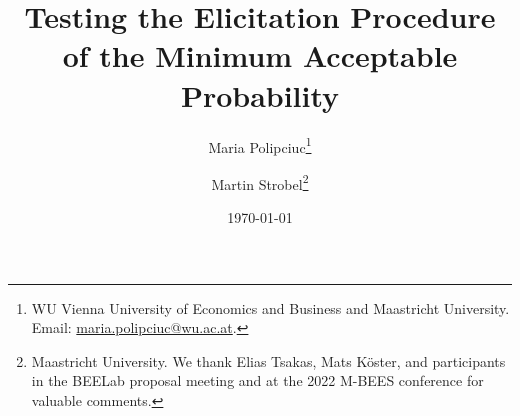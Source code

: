 
\title{Testing the Elicitation Procedure \\ of the Minimum Acceptable Probability}
\author{Maria Polipciuc\thanks{WU Vienna University of Economics and Business and Maastricht University. Email: \url{maria.polipciuc@wu.ac.at}.} \and Martin Strobel\thanks{Maastricht University. We thank Elias Tsakas, Mats K\"{o}ster, and participants in the BEELab proposal meeting and at the 2022 M-BEES conference for valuable comments.}}
\date{\today	\vspace{1cm}}
\titlepage



\begin{titlepage}
\clearpage
\maketitle
\thispagestyle{empty}


\begin{abstract}
%
%


\end{abstract}
\end{titlepage}
